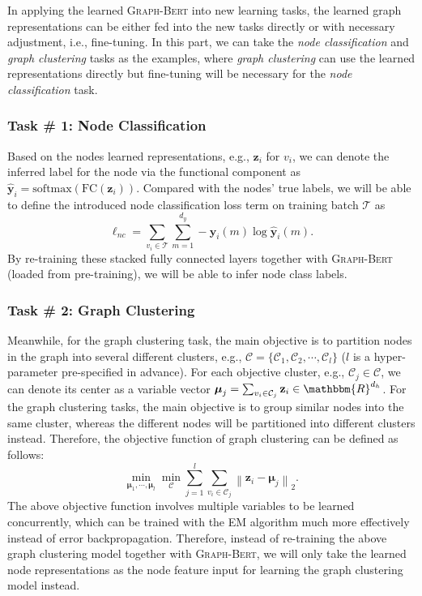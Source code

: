 \documentclass{article}
\newcommand{\mb}{\mathbf}
\newcommand{\mc}{\mathcal}
\newcommand{\bs}{\boldsymbol}
\newcommand{\our}{\textsc{Graph-Bert}}
\begin{document}
In applying the learned {\our} into new learning tasks, the learned graph representations can be either fed into the new tasks directly or with necessary adjustment, i.e., fine-tuning. In this part, we can take the \textit{node classification} and \textit{graph clustering} tasks as the examples, where \textit{graph clustering} can use the learned representations directly but fine-tuning will be necessary for the \textit{node classification} task.

\subsubsection{Task \# 1: Node Classification}\label{subsec:node_classification}

Based on the nodes learned representations, e.g., $\mb{z}_i$ for $v_i$, we can denote the inferred label for the node via the functional component as $\hat{\mb{y}}_i = \mbox{softmax}( \mbox{FC} (\mb{z}_i))$. Compared with the nodes' true labels, we will be able to define the introduced node classification loss term on training batch $\mc{T}$ as
\begin{equation}
\ell_{nc} = \sum_{v_i \in \mc{T}} \sum_{m = 1}^{d_y} - \mb{y}_i(m) \log \hat{\mb{y}}_i (m).
\end{equation}
By re-training these stacked fully connected layers together with {\our} (loaded from pre-training), we will be able to infer node class labels.

\subsubsection{Task \# 2: Graph Clustering}\label{subsec:graph_clustering}

Meanwhile, for the graph clustering task, the main objective is to partition nodes in the graph into several different clusters, e.g., $\mc{C} = \{\mc{C}_1, \mc{C}_2, \cdots, \mc{C}_l\}$ ($l$ is a hyper-parameter pre-specified in advance). For each objective cluster, e.g., $\mc{C}_j \in \mc{C}$, we can denote its center as a variable vector $\bs{\mu}_j = \sum_{v_i \in\mc{C}_j} \mb{z}_i \in \mathbbm{R}^{d_h}$. For the graph clustering tasks, the main objective is to group similar nodes into the same cluster, whereas the different nodes will be partitioned into different clusters instead. Therefore, the objective function of graph clustering can be defined as follows:
\begin{equation}
\min_{\bs{\mu}_1, \cdots, \bs{\mu}_l} \min_{\mc{C}} \sum_{j=1}^l \sum_{v_i \in \mc{C}_j} \left \| \mb{z}_i - \bs{\mu}_j \right\|_2.
\end{equation}
The above objective function involves multiple variables to be learned concurrently, which can be trained with the EM algorithm much more effectively instead of error backpropagation. Therefore, instead of re-training the above graph clustering model together with {\our}, we will only take the learned node representations as the node feature input for learning the graph clustering model instead. 
\end{document}
